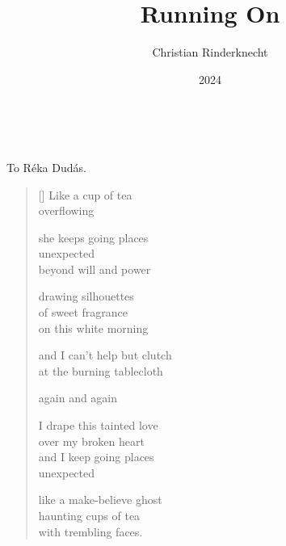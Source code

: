 \documentclass[14pt]{extbook}
\title{Running On}
\author{Christian Rinderknecht}
\date{\small 2024}
\newcommand{\clearemptydoublepage}{\newpage{\pagestyle{empty}\cleardoublepage}}
\newcommand*{\centeredornament}{\centerline{\pgfornament[width=6cm]{88}}}
\begin{document}
\maketitle

\thispagestyle{empty} \ \clearemptydoublepage
\thispagestyle{empty} \ \clearemptydoublepage

\thispagestyle{empty}

\vspace*{4cm}

\begin{flushright}
To Réka Dudás.
\end{flushright}

\thispagestyle{empty}

\newpage\leavevmode\thispagestyle{empty}\newpage



\newpage

\vspace*{-15mm}
\centeredornament
\vspace*{-7mm}


\settowidth{\versewidth}{Like a make-believe ghost}

\begin{verse}[\versewidth]
  Like a cup of tea \\
  overflowing

  she keeps going places \\
  unexpected \\
  beyond will and power

  drawing silhouettes \\
  of sweet fragrance \\
  on this white morning

  and I can't help but clutch \\
  at the burning tablecloth

  again and again

  I drape this tainted love \\
  over my broken heart \\
  and I keep going places \\
  unexpected

  like a make-believe ghost \\
  haunting cups of tea \\
  with trembling faces.
\end{verse}
\end{document}
